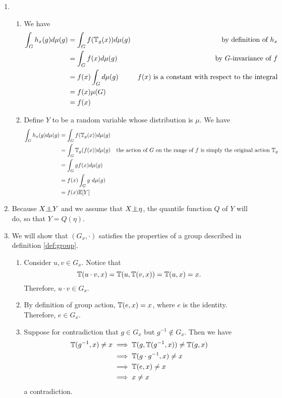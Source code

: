 \begin{enumerate}
\item
\begin{enumerate}[label=(\alph*)]
	\item
	We have
	$$
	\begin{aligned}
		\int_{G} h_x(g) d \mu(g) & = \int_G f(\mathbb{T}_g(x)) d \mu(g) & \textrm{by definition of $h_x$} \\
		                         & = \int_G f(x) d \mu(g) & \textrm{by $G$-invariance of $f$} \\
		                         & = f(x) \int_G d \mu(g) & \textrm{$f(x)$ is a constant with respect to the integral} \\
		                         & = f(x) \mu(G) \\
		                         & = f(x)
	\end{aligned}
	$$
	
	\item
	Define $Y$ to be a random variable whose distribution is $\mu$.
	We have
	$$
	\begin{aligned}
		\int_G h_x(g) d \mu(g) & = \int_G f(\mathbb{T}_g(x)) d \mu(g) \\
		                       & = \int_G \mathbb{T}_g(f(x)) d \mu(g) & \textrm{the action of $G$ on the range of $f$ is simply the original action $\mathbb{T}_g$} \\ 
		                       & = \int_G g f(x) d \mu(g) \\
		                       & = f(x) \int_G g\ d \mu(g) \\
		                       & = f(x) \mathbb{E}[Y]
	\end{aligned}
	$$
\end{enumerate}

\item 
Because $X \indep Y$ and we assume that $X \indep \eta$, the quantile function $Q$ of $Y$ will do, so that
$
	Y = Q(\eta).
$

\item We will show that $(G_x, \cdot)$ satisfies the properties of a group described in definition \ref{def:group}.
\begin{enumerate}
	\item
	Consider $u,v \in G_x$.
	Notice that
	$$
		\mathbb{T}(u \cdot v, x) = \mathbb{T}(u, \mathbb{T}(v,x)) = \mathbb{T}(u, x) = x.
	$$
	Therefore, $u \cdot v \in G_x$.
	
	\item
	By definition of group action, $\mathbb{T}(e,x) = x$, where $e$ is the identity.
	Therefore, $e \in G_x$.
	
	\item
	Suppose for contradiction that $g \in G_x$ but $g^{-1} \not \in G_x$.
	Then we have
	$$
	\begin{aligned} 
		\mathbb{T}(g^{-1},x) \neq x & \implies \mathbb{T}(g, \mathbb{T}(g^{-1}, x)) \neq \mathbb{T}(g, x) \\
		& \implies \mathbb{T}(g\cdot g^{-1}, x) \neq x \\
		& \implies \mathbb{T}(e, x) \neq x \\
		& \implies x \neq x
	\end{aligned}
	$$
	a contradiction.
\end{enumerate}
\end{enumerate}